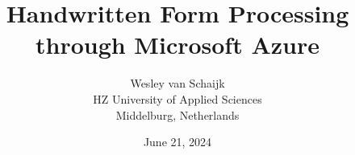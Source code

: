 \documentclass{article}
\title{Handwritten Form Processing through Microsoft Azure}
\author{Wesley van Schaijk \\ HZ University of Applied Sciences \\ Middelburg, Netherlands}
\date{June 21, 2024}
\begin{document}
\maketitle




\newpage

\begin{multicols}{2}
    
    
    
    
    
    
    
\end{multicols}

{
    \newpage
    \raggedright
    
    
}
\end{document}
